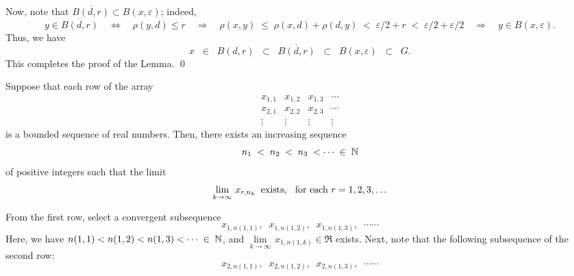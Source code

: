 \vskip 0.3cm
\noindent
Now, note that $\overline{B(d,r)} \subset B(x,\varepsilon)$; indeed,
\begin{equation*}
y \in \overline{B(d,r)}
\quad\Longleftrightarrow\quad \rho(y,d) \leq r
\quad\Longrightarrow\quad \rho(x,y) \;\leq\; \rho(x,d) + \rho(d,y) \;<\; \varepsilon/2 + r \;<\; \varepsilon/2 + \varepsilon/2
\quad\Longrightarrow\quad y \in B(x,\varepsilon).
\end{equation*}
Thus, we have
\begin{equation*}
x \;\; \in \;\; B(d,r) \;\; \subset \;\; \overline{B(d,r)} \;\; \subset \;\; B(x,\varepsilon) \;\; \subset \;\; G.
\end{equation*}
This completes the proof of the Lemma.
\qed

\vskip 0.6cm
\begin{theorem}
\label{theorem:DiagonalMethod}
\mbox{}
\vskip 0.3cm
\noindent
Suppose that each row of the array
\begin{equation*}
\begin{array}{cccc}
x_{1,1} & x_{1,2} & x_{1,3} & \cdots \\
x_{2,1} & x_{2,2} & x_{2,3} & \cdots \\
\vdots & \vdots & \vdots & \vdots  
\end{array}
\end{equation*}
is a bounded sequence of real numbers.
Then, there exists an increasing sequence
\begin{equation*}
n_{1} \; < \; n_{2} \; < \; n_{3} \; < \cdots \; \in \; \mathbb{N}
\end{equation*}
of positive integers such that the limit
\begin{equation*}
\lim_{k\rightarrow\infty}\,x_{r,n_{k}}
\;\;\textnormal{exists, \;\;for each $r = 1, 2, 3, \ldots$}
\end{equation*}
\end{theorem}
\proof
From the first row, select a convergent subsequence
\begin{equation*}
x_{1,n(1,1)},\;\;
x_{1,n(1,2)},\;\; 
x_{1,n(1,3)},\;\;
\cdots\cdots 
\end{equation*}
Here, we have $n(1,1) < n(1,2) < n(1,3) < \cdots \;\in\;\mathbb{N}$, and
$\underset{k\rightarrow\infty}{\lim}\,x_{1,n(1,k)} \in \Re$ exists.
Next, note that the following subsequence of the second row:
\begin{equation*}
x_{2,n(1,1)},\;\;
x_{2,n(1,2)},\;\; 
x_{2,n(1,3)},\;\;
\cdots\cdots 
\end{equation*}
